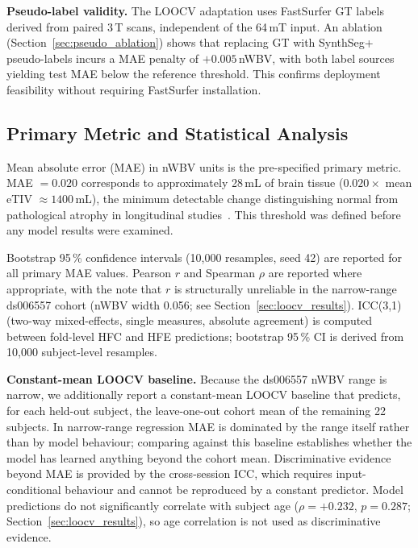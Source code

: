 \documentclass[12pt,a4paper]{article}
\begin{document}
\textbf{Pseudo-label validity.}
The LOOCV adaptation uses FastSurfer GT labels derived from paired 3\,T
scans, independent of the 64\,mT input. An ablation (Section~\ref{sec:pseudo_ablation})
shows that replacing GT with SynthSeg+ pseudo-labels incurs a MAE penalty
of $+0.005$\,nWBV, with both label sources yielding test MAE below the
reference threshold. This confirms deployment feasibility without requiring
FastSurfer installation.

\subsection{Primary Metric and Statistical Analysis}
\label{sec:metrics}

Mean absolute error (MAE) in nWBV units is the pre-specified primary metric.
MAE $= 0.020$ corresponds to approximately 28\,mL of brain tissue
($0.020 \times$ mean eTIV $\approx 1400$\,mL), the minimum detectable
change distinguishing normal from pathological atrophy in longitudinal
studies~\cite{buckner2004}. This threshold was defined before any model
results were examined.

Bootstrap 95\,\% confidence intervals (10{,}000 resamples, seed 42) are
reported for all primary MAE values. Pearson $r$ and Spearman $\rho$ are
reported where appropriate, with the note that $r$ is structurally
unreliable in the narrow-range ds006557 cohort (nWBV width 0.056;
see Section~\ref{sec:loocv_results}). ICC(3,1) (two-way mixed-effects,
single measures, absolute agreement) is computed between fold-level HFC
and HFE predictions; bootstrap 95\,\% CI is derived from 10{,}000 subject-level
resamples.

\textbf{Constant-mean LOOCV baseline.}
Because the ds006557 nWBV range is narrow, we additionally report a
constant-mean LOOCV baseline that predicts, for each held-out subject,
the leave-one-out cohort mean of the remaining 22 subjects. In
narrow-range regression MAE is dominated by the range itself rather
than by model behaviour; comparing against this baseline establishes
whether the model has learned anything beyond the cohort mean.
Discriminative evidence beyond MAE is provided by the cross-session
ICC, which requires input-conditional behaviour and cannot be
reproduced by a constant predictor. Model predictions do not
significantly correlate with subject age ($\rho = +0.232$,
$p = 0.287$; Section~\ref{sec:loocv_results}), so age correlation
is not used as discriminative evidence.

\end{document}
